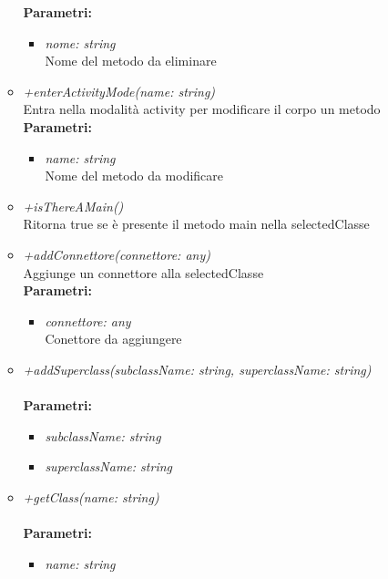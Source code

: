 \begin{itemize}
\begin{itemize}
    		\textbf{Parametri:}
    		\begin{itemize}
    			\item \emph{nome: string}\\
    			Nome del metodo da eliminare
    		\end{itemize}
    		\item \emph{+enterActivityMode(name: string)}\\
    		Entra nella modalità activity per modificare il corpo un metodo\\
    		\textbf{Parametri:}
    		\begin{itemize}
    			\item \emph{name: string}\\
    			Nome del metodo da modificare
    		\end{itemize}
    		\item \emph{+isThereAMain()}\\
    		Ritorna true se è presente il metodo main nella selectedClasse
    		\item \emph{+addConnettore(connettore: any)}\\
    		Aggiunge un connettore alla selectedClasse\\
    		\textbf{Parametri:}
    		\begin{itemize}
    			\item \emph{connettore: any}\\
    			Conettore da aggiungere
    		\end{itemize}
    		\item \emph{+addSuperclass(subclassName: string, superclassName: string)}\\
    		\\
    		\textbf{Parametri:}
    		\begin{itemize}
    			\item \emph{subclassName: string}\\
    			
    			\item \emph{superclassName: string}\\
    			
    		\end{itemize}
    		\item \emph{+getClass(name: string)}\\
    		\\
    		\textbf{Parametri:}
    		\begin{itemize}
    			\item \emph{name: string}\\
    			

\end{itemize}
\end{itemize}
\end{itemize}
